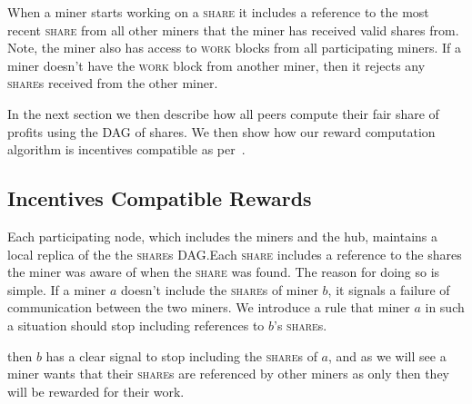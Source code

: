 \documentclass{article}
\begin{document}
When a miner starts working on a \textsc{share} it includes a
reference to the most recent \textsc{share} from all other miners that
the miner has received valid shares from. Note, the miner also has
access to \textsc{work} blocks from all participating miners. If a
miner doesn't have the \textsc{work} block from another miner, then it
rejects any \textsc{share}s received from the other miner.

In the next section we then describe how all peers compute their fair
share of profits using the DAG of shares. We then show how our reward
computation algorithm is incentives
compatible as per~\cite{incentives-compatible}.

  
  
\subsection{Incentives Compatible Rewards}\label{sec:rewards}

Each participating node, which includes the miners and the hub,
maintains a local replica of the the \textsc{share}s DAG.\@ Each
\textsc{share} includes a reference to the shares the miner was aware
of when the \textsc{share} was found. The reason for doing so is
simple. If a miner $a$ doesn't include the \textsc{share}s of miner
$b$, it signals a failure of communication between the two miners. We
introduce a rule that miner $a$ in such a situation should stop
including references to $b$'s \textsc{share}s.

then $b$ has a clear signal to stop including the \textsc{share}s
of $a$, and as we will see a miner wants that their \textsc{share}s
are referenced by other miners as only then they will be rewarded for
their work.
\end{document}
